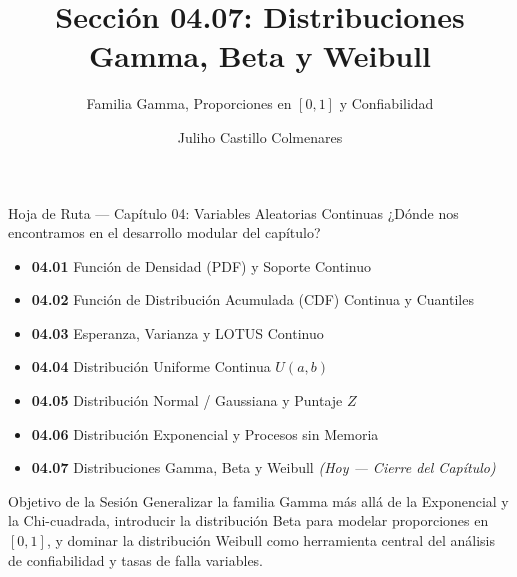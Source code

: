 \documentclass[10pt, aspectratio=169]{beamer}
\title[Gamma, Beta y Weibull]{Sección 04.07: Distribuciones Gamma, Beta y Weibull}
\subtitle{Familia Gamma, Proporciones en $[0,1]$ y Confiabilidad}
\author[J. Castillo Colmenares]{Juliho Castillo Colmenares}
\institute{Tecnológico de Monterrey}
\date{\vspace{-1.2cm}}
\begin{document}
\begin{frame}[plain]
  \vspace{-0.8cm}
  \titlepage
\end{frame}

\begin{frame}{Hoja de Ruta --- Capítulo 04: Variables Aleatorias Continuas}
  \footnotesize
  ¿Dónde nos encontramos en el desarrollo modular del capítulo? \pause
  \begin{itemize}\itemsep=0.08em
    \item \textbf{04.01} Función de Densidad (PDF) y Soporte Continuo \pause
    \item \textbf{04.02} Función de Distribución Acumulada (CDF) Continua y Cuantiles \pause
    \item \textbf{04.03} Esperanza, Varianza y LOTUS Continuo \pause
    \item \textbf{04.04} Distribución Uniforme Continua $U(a, b)$ \pause
    \item \textbf{04.05} Distribución Normal / Gaussiana y Puntaje $Z$ \pause
    \item \textbf{04.06} Distribución Exponencial y Procesos sin Memoria \pause
    \item \textbf{04.07} Distribuciones Gamma, Beta y Weibull \emph{(Hoy --- Cierre del Capítulo)}
  \end{itemize}
  \vspace{-0.05cm}
  \begin{block}{Objetivo de la Sesión}
    Generalizar la familia Gamma más allá de la Exponencial y la Chi-cuadrada, introducir la distribución Beta para modelar proporciones en $[0,1]$, y dominar la distribución Weibull como herramienta central del análisis de confiabilidad y tasas de falla variables.
  \end{block}
\end{frame}
\end{document}
